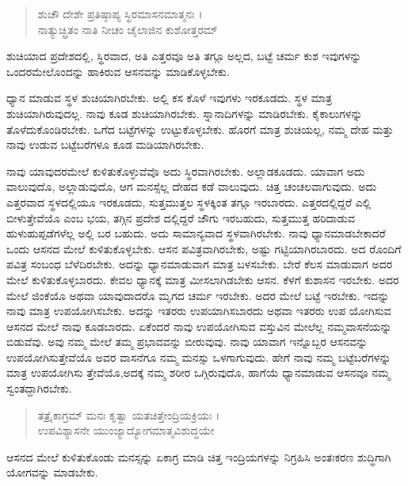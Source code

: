 \begin{verse}
ಶುಚೌ ದೇಶೇ ಪ್ರತಿಷ್ಠಾಪ್ಯ ಸ್ಥಿರಮಾಸನಮಾತ್ಮನಃ ।\\ನಾತ್ಯುಚ್ಛ್ರಿತಂ ನಾತಿ ನೀಚಂ ಚೈಲಾಜಿನ ಕುಶೋತ್ತರಮ್ 
\end{verse}

{\small ಶುಚಿಯಾದ ಪ್ರದೇಶದಲ್ಲಿ, ಸ್ಥಿರವಾದ, ಅತಿ ಎತ್ತರವೂ ಅತಿ ತಗ್ಗೂ ಅಲ್ಲದ, ಬಟ್ಟೆ ಚರ್ಮ ಕುಶ ಇವುಗಳನ್ನು ಒಂದರಮೇಲೊಂದನ್ನು ಹಾಕಿರುವ ಆಸನವನ್ನು ಮಾಡಿಕೊಳ್ಳಬೇಕು.}

ಧ್ಯಾನ ಮಾಡುವ ಸ್ಥಳ ಶುಚಿಯಾಗಿರಬೇಕು. ಅಲ್ಲಿ ಕಸ ಕೊಳೆ ಇವುಗಳು ಇರಕೂಡದು. ಸ್ಥಳ ಮಾತ್ರ ಶುಚಿಯಾಗಿರುವುದಲ್ಲ. ನಾವು ಕೂಡ ಶುಚಿಯಾಗಿರಬೇಕು. ಸ್ನಾನಾದಿಗಳನ್ನು ಮಾಡಿರಬೇಕು. ಕೈಕಾಲುಗಳನ್ನು ತೊಳೆದುಕೊಂಡಿರಬೇಕು. ಒಗೆದ ಬಟ್ಟೆಗಳನ್ನು ಉಟ್ಟುಕೊಳ್ಳಬೇಕು. ಹೊರಗೆ ಮಾತ್ರ ಶುಚಿಯಲ್ಲ, ನಮ್ಮ ದೇಹ ಮತ್ತು ನಾವು ಉಡುವ ಬಟ್ಟೆಬರೆಗಳೂ ಕೂಡ ಮಡಿಯಾಗಿರಬೇಕು.

ನಾವು ಯಾವುದರಮೇಲೆ ಕುಳಿತುಕೊಳ್ಳುವೆವೊ ಅದು ಸ್ಥಿರವಾಗಿರಬೇಕು. ಅಲ್ಲಾಡಕೂಡದು. ಯಾವಾಗ ಅದು ವಾಲುವುದೊ, ಅಲ್ಲಾಡುವುದೊ, ಆಗ ಮನಸ್ಸೆಲ್ಲ ದೇಹದ ಕಡೆ ವಾಲುವುದು. ಚಿತ್ತ ಚಂಚಲವಾಗುವುದು. ಅದು ಎತ್ತರವಾದ ಸ್ಥಳದಲ್ಲಿಯೂ ಇರಕೂಡದು, ಸುತ್ತಮುತ್ತಲ ಸ್ಥಳಕ್ಕಿಂತ ತಗ್ಗೂ ಇರಬಾರದು. ಎತ್ತರದಲ್ಲಿದ್ದರೆ ಎಲ್ಲಿ ಬೀಳುತ್ತೇವೆಯೊ ಎಂಬ ಭಯ, ತಗ್ಗಿನ ಪ್ರದೇಶ ದಲ್ಲಿದ್ದರೆ ಜೌಗು ಇರಬಹುದು, ಸುತ್ತಮುತ್ತ ಹರಿದಾಡುವ ಹುಳುಹುಪ್ಪಡೆಗಳೆಲ್ಲ ಅಲ್ಲಿ ಬರ ಬಹುದು. ಅದು ಸಾಮಾನ್ಯವಾದ ಸ್ಥಳವಾಗಿರಬೇಕು. ನಾವು ಧ್ಯಾನಮಾಡಬೇಕಾದರೆ ಒಂದು ಆಸನದ ಮೇಲೆ ಕುಳಿತುಕೊಳ್ಳಬೇಕು. ಆಸನ ಪವಿತ್ರವಾಗಿರಬೇಕು, ಅಷ್ಟು ಗಟ್ಟಿಯಾಗಿರಬಾರದು. ಅದ ರೊಂದಿಗೆ ಪವಿತ್ರ ಸಂಬಂಧ ಬೆಳೆದಿರಬೇಕು. ಅದನ್ನು ಧ್ಯಾನಮಾಡುವಾಗ ಮಾತ್ರ ಬಳಸಬೇಕು. ಬೇರೆ ಕೆಲಸ ಮಾಡುವಾಗ ಅದರ ಮೇಲೆ ಕುಳಿತುಕೊಳ್ಳಬಾರದು. ಕೇವಲ ಧ್ಯಾನಕ್ಕೆ ಮಾತ್ರ ಮೀಸಲಾಗಿಡಬೇಕು ಆಸನ. ಕೆಳಗೆ ಕುಶಾಸನ ಇರಬೇಕು. ಅದರ ಮೇಲೆ ಜಿಂಕೆಯೊ ಅಥವಾ ಯಾವುದಾದರೊ ಮೃಗದ ಚರ್ಮ ಇರಬೇಕು. ಅದರ ಮೇಲೆ ಬಟ್ಟೆ ಇರಬೇಕು. ಇದನ್ನು ನಾವು ಮಾತ್ರ ಉಪಯೋಗಿಸಬೇಕು. ಅದನ್ನು ಇತರರು ಉಪಯಾಗಿಸಬಾರದು ಅಥವಾ ಇತರರು ಉಪ ಯೋಗಿಸುವ ಆಸನದ ಮೇಲೆ ನಾವು ಕೂಡಬಾರದು. ಏಕೆಂದರೆ ನಾವು ಉಪಯೋಗಿಸುವ ವಸ್ತುವಿನ ಮೇಲೆಲ್ಲ ನಮ್ಮವಾಸನೆಯನ್ನು ಬಿಡುವೆವು. ಅವು ನಮ್ಮ ಮೇಲೆ ತಮ್ಮ ಪ್ರಭಾವವನ್ನು ಬೀರುವುವು. ನಾವು ಯಾವಾಗ ಇನ್ನೊಬ್ಬರ ಆಸನವನ್ನು ಉಪಯೋಗಿಸುತ್ತೇವೆಯೊ ಅವರ ವಾಸನೆಗೂ ನಮ್ಮ ಮನಸ್ಸು ಒಳಗಾಗುವುದು. ಹೇಗೆ ನಾವು ನಮ್ಮ ಬಟ್ಟೆಬರೆಗಳನ್ನು ಮಾತ್ರ ಉಪಯೋಗಿಸು ತ್ತೇವೆಯೊ,ಅದಕ್ಕೆ ನಮ್ಮ ಶರೀರ ಒಗ್ಗಿರುವುದೊ, ಹಾಗೆಯೆ ಧ್ಯಾನಮಾಡುವ ಆಸನವೂ ನಮ್ಮ ಸ್ವಂತದ್ದಾಗಿರಬೇಕು.

\begin{verse}
ತತ್ರೈಕಾಗ್ರಮ್ ಮನಃ ಕೃತ್ವಾ ಯತಚಿತ್ತೇಂದ್ರಿಯಕ್ರಿಯಃ ।\\ಉಪವಿಶ್ಯಾಸನೇ ಯುಂಜ್ಯಾದ್ಯೋಗಮಾತ್ಮವಿಶುದ್ಧಯೇ 
\end{verse}

{\small ಆಸನದ ಮೇಲೆ ಕುಳಿತುಕೊಂಡು ಮನಸ್ಸನ್ನು ಏಕಾಗ್ರ ಮಾಡಿ ಚಿತ್ತ ಇಂದ್ರಿಯಗಳನ್ನು ನಿಗ್ರಹಿಸಿ ಅಂತಃಕರಣ ಶುದ್ಧಿಗಾಗಿ ಯೋಗವನ್ನು ಮಾಡಬೇಕು.}

